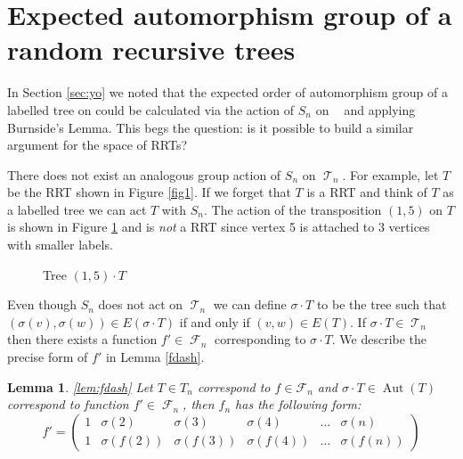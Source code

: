 \documentclass[oneside]{book} %
\newtheorem{lem}[thm]{Lemma}
\theoremstyle{definition}
\numberwithin{equation}{section}
\DeclareMathOperator{\Aut}{Aut} %
\DeclareMathOperator{\T}{\mathcal{T}}
\DeclareMathOperator{\lT}{\tilde{\mathcal{T}}_n}
\DeclareMathOperator{\F}{\mathcal{F}}
\begin{document}


\section{Expected automorphism group of a random recursive trees}
In Section \ref{sec:yo} we noted that the expected order of automorphism group of a labelled tree on could be calculated via
the action of $S_n$ on $\lT$ and applying Burnside's Lemma.  This begs the question: is it possible to build a similar argument for the space of RRTs? 

There does not exist an analogous group action of $S_n$ on $\T_n$. For example, let $T$ be the RRT shown in Figure \ref{fig1}.
If we forget that $T$ is a RRT and think of $T$ as a labelled tree we can act $T$ with $S_n$.  The action of the 
transposition $(1,5)$ on $T$ is shown in Figure \ref{fig3} and is \emph{not} a RRT since vertex 5 is attached to 3 vertices with smaller labels. 

\begin{figure}[ht]
\centering
{}
\caption{Tree $(1,5) \cdot T$}\label{fig3}
\end{figure}

Even though $S_n$ does not act on $\T_n$ we can define $\sigma \cdot T$ to be the tree such that $(\sigma(v),\sigma(w)) \in E(\sigma \cdot T)$ if and only if $(v,w) \in E(T)$.  If $\sigma \cdot T \in \T_n$ then there exists a function $f' \in \F_n$ corresponding to $\sigma \cdot T$.  We describe the precise form of $f'$ in Lemma \ref{fdash}. 

\begin{lem}\ref{lem:fdash}
Let $T \in T_n$ correspond to $f \in \mathcal{F}_n$ and  $\sigma \cdot T \in \Aut(T)$ correspond to function $f' \in \F_n$, then $f_n$ has the following form:  
\[ f'= \left(\begin{array}{cccccc}
     1& \sigma(2)&\sigma(3) &\sigma(4)& \dots & \sigma(n) \\
     1 & \sigma(f(2)) &\sigma(f(3)) &\sigma(f(4)) &\dots & \sigma(f(n))
    \end{array} \right)
\]
\end{lem}
\end{document}
